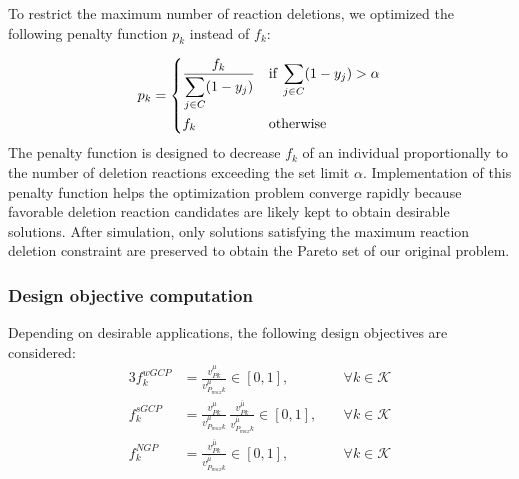 To restrict the maximum number of reaction deletions, we optimized the following penalty function $p_k$ instead of $f_k$:

\begin{equation} \label{eq:pkp}
p_k =
\begin{dcases}
\frac{f_k}{\displaystyle \sum_{j\in C} (1-y_j)} & \text{if}\;  \sum_{j\in C} (1-y_j) > \alpha\\
f_k & \text{otherwise}
\end{dcases}
\end{equation}
The penalty function is designed to decrease $f_k$ of an individual proportionally to the number of deletion reactions exceeding the set limit $\alpha$. Implementation of this penalty function helps the  optimization problem converge rapidly because favorable deletion reaction candidates are likely kept to obtain desirable solutions. After simulation, only solutions satisfying the maximum reaction deletion constraint are preserved to obtain the Pareto set of our original problem.

\subsubsection{Design objective computation} \label{sec:design_obj_comp}
Depending on desirable applications, the following design objectives are considered:
\begin{alignat}{3}
	f_k^{wGCP} & =\frac{v_{Pk}^{\mu}}{v_{P_{max}k}^{\mu}}\in[0,1], \qquad & & \forall k\in \mathcal{K} \label{eq:obj_wgcp}\\
	f_k^{sGCP} & =\frac{v_{Pk}^{\mu}}{v_{P_{max}k}^{\mu}} \, \frac{v_{Pk}^{\bar{\mu}}}{v_{P_{max}k}^{\bar{\mu}}} \in[0,1], \;  & &  \forall k\in \mathcal{K} \label{eq:obj_sgcp}\\
	f_k^{NGP} & = \frac{v_{Pk}^{\bar{\mu}}}{v_{P_{max}k}^{\bar{\mu}}} \in[0,1], \qquad  & &  \forall k\in \mathcal{K} \label{eq:obj_ngp}
	\end{alignat}


